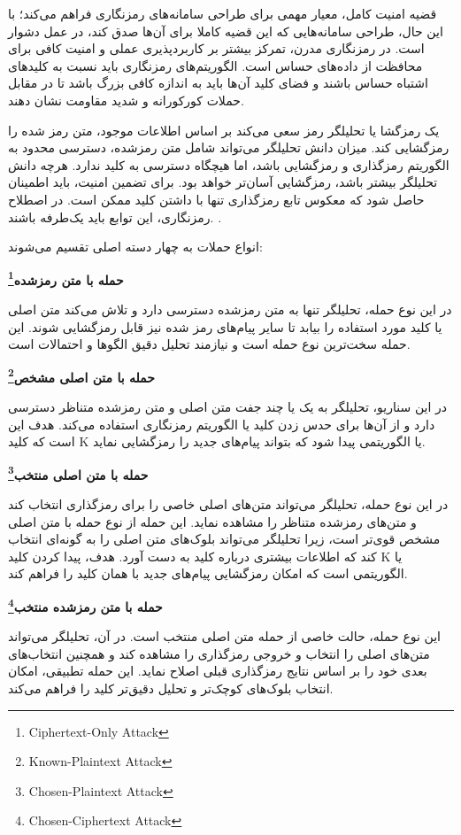 قضیه امنیت کامل، معیار مهمی برای طراحی سامانه‌های رمزنگاری فراهم می‌کند؛ با این حال، طراحی سامانه‌هایی که این قضیه کاملا برای آن‌ها صدق کند، در عمل دشوار است. در رمزنگاری مدرن، تمرکز بیشتر بر کاربردپذیری عملی و امنیت کافی برای محافظت از داده‌های حساس است. الگوریتم‌های رمزنگاری باید نسبت به کلیدهای اشتباه حساس باشند و فضای کلید آن‌ها باید به اندازه کافی بزرگ باشد تا در مقابل حملات کورکورانه و شدید مقاومت نشان دهند\cite{ref32}.

یک رمزگشا یا تحلیلگر رمز سعی می‌کند بر اساس اطلاعات موجود، متن رمز شده را رمزگشایی کند. میزان دانش تحلیلگر می‌تواند شامل متن رمزشده، دسترسی محدود به الگوریتم رمزگذاری و رمزگشایی باشد، اما هیچگاه دسترسی به کلید ندارد. هرچه دانش تحلیلگر بیشتر باشد، رمزگشایی آسان‌تر خواهد بود. برای تضمین امنیت، باید اطمینان حاصل شود که معکوس تابع رمزگذاری تنها با داشتن کلید ممکن است. در اصطلاح رمزنگاری، این توابع باید یک‌طرفه باشند. \cite{ref33}.

انواع حملات به چهار دسته اصلی تقسیم می‌شوند\cite{ref34}:

\textbf{حمله با متن رمزشده\footnote{Ciphertext-Only Attack}}

در این نوع حمله، تحلیلگر تنها به متن رمزشده دسترسی دارد و تلاش می‌کند متن اصلی یا کلید مورد استفاده را بیابد تا سایر پیام‌های رمز شده نیز قابل رمزگشایی شوند. این حمله سخت‌ترین نوع حمله است و نیازمند تحلیل دقیق الگوها و احتمالات است.

\textbf{حمله با متن اصلی مشخص\footnote{Known-Plaintext Attack}}

در این سناریو، تحلیلگر به یک یا چند جفت متن اصلی و متن رمزشده متناظر دسترسی دارد و از آن‌ها برای حدس زدن کلید یا الگوریتم رمزنگاری استفاده می‌کند. هدف این است که کلید K یا الگوریتمی پیدا شود که بتواند پیام‌های جدید را رمزگشایی نماید.

\textbf{حمله با متن اصلی منتخب\footnote{Chosen-Plaintext Attack}}

در این نوع حمله، تحلیلگر می‌تواند متن‌های اصلی خاصی را برای رمزگذاری انتخاب کند و متن‌های رمزشده متناظر را مشاهده نماید. این حمله از نوع حمله با متن اصلی مشخص قوی‌تر است، زیرا تحلیلگر می‌تواند بلوک‌های متن اصلی را به گونه‌ای انتخاب کند که اطلاعات بیشتری درباره کلید به دست آورد. هدف، پیدا کردن کلید K یا الگوریتمی است که امکان رمزگشایی پیام‌های جدید با همان کلید را فراهم کند.

\textbf{حمله با متن رمزشده منتخب\footnote{Chosen-Ciphertext Attack}}

این نوع حمله، حالت خاصی از حمله متن اصلی منتخب است. در آن، تحلیلگر می‌تواند متن‌های اصلی را انتخاب و خروجی رمزگذاری را مشاهده کند و همچنین انتخاب‌های بعدی خود را بر اساس نتایج رمزگذاری قبلی اصلاح نماید. این حمله تطبیقی، امکان انتخاب بلوک‌های کوچک‌تر و تحلیل دقیق‌تر کلید را فراهم می‌کند.

